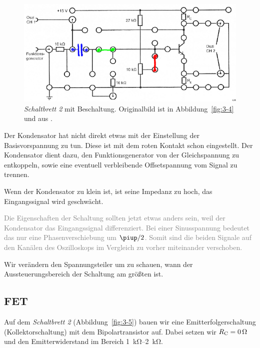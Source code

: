 \begin{figure}[htbp]
	\centering
	\includegraphics[width=\textwidth]{Anleitung/3-4_Arbeitspunkt.png}
	\caption{
		\emph{Schaltbrett 2} mit Beschaltung. Originalbild ist in
		Abbildung~\ref{fig:3-4} und aus
		\cite[Abbildung~3.4]{physik313-Anleitung}.
	}
	\label{fig:3-4_Arbeitspunkt}
\end{figure}

Der Kondensator hat nicht direkt etwas mit der Einstellung der Basisvorspannung
zu tun. Diese ist mit dem roten Kontakt schon eingestellt. Der Kondensator
dient dazu, den Funktionsgenerator von der Gleichspannung zu entkoppeln, sowie
eine eventuell verbleibende Offsetspannung vom Signal zu trennen.

Wenn der Kondensator zu klein ist, ist seine Impedanz zu hoch, das
Eingangssignal wird geschwächt.

\textcolor{gray}{
	Die Eigenschaften der Schaltung sollten jetzt etwas anders sein, weil der
	Kondensator das Eingangssignal differenziert. Bei einer Sinusspannung
	bedeutet das nur eine Phasenverschiebung um $\piup/2$. Somit sind die
	beiden Signale auf den Kanälen des Oszilloskops im Vergleich zu vorher
	miteinander verschoben.
}

Wir verändern den Spannungsteiler um zu schauen, wann der Aussteuerungsbereich
der Schaltung am größten ist.

\fehlt

\FloatBarrier
\subsection{FET}

Auf dem \emph{Schaltbrett 2} (Abbildung~\ref{fig:3-5}) bauen wir eine
Emitterfolgerschaltung (Kollektorschaltung) mit dem Bipolartransistor auf.
Dabei setzen wir $\RC = \SI0\ohm$ und den Emitterwiderstand im Bereich
\SIrange{1}{2}{\kilo\ohm}.


